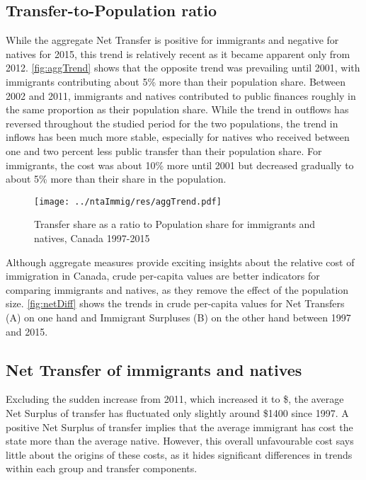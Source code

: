 \subsection{Transfer-to-Population ratio}
While the aggregate Net Transfer is positive for immigrants and negative for natives for 2015, this trend is relatively recent as it became apparent only from 2012.
\autoref{fig:aggTrend} shows that the opposite trend was prevailing until 2001, with immigrants contributing about 5\% more than their population share.
Between 2002 and 2011, immigrants and natives contributed to public finances roughly in the same proportion as their population share.
While the trend in outflows has reversed throughout the studied period for the two populations, the trend in inflows has been much more stable, especially for natives who received between one and two percent less public transfer than their population share.
For immigrants, the cost was about 10\% more until 2001 but decreased gradually to about 5\% more than their share in the population.

  \begin{figure}[H]%
    \caption{Transfer share as a ratio to Population share for immigrants and natives, Canada 1997-2015}
    \texttt{[image: ../ntaImmig/res/aggTrend.pdf]}%
    \label{fig:aggTrend}%
  \end{figure}%

Although aggregate measures provide exciting insights about the relative cost of immigration in Canada, crude per-capita values are better indicators for comparing immigrants and natives, as they remove the effect of the population size. \autoref{fig:netDiff} shows the trends in crude per-capita values for Net Transfers (A) on one hand and Immigrant Surpluses (B) on the other hand between 1997 and 2015.

\subsection{Net Transfer of immigrants and natives}
Excluding the sudden increase from 2011, which increased it to \$, the average Net Surplus of transfer has fluctuated only slightly around \$\num{1400} since 1997.
A positive Net Surplus of transfer implies that the average immigrant has cost the state more than the average native.
However, this overall unfavourable cost says little about the origins of these costs, as it hides significant differences in trends within each group and transfer components.

